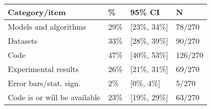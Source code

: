 \begin{tabular}{llll}
\hline
Category/item & \% & 95\% CI  & N \\
\hline
Models and algorithms & 29\% & [23\%, 34\%] & 78/270\\
Datasets & 33\% & [28\%, 39\%] & 90/270\\
Code & 47\% & [40\%, 53\%] & 126/270\\
Experimental results & 26\% & [21\%, 31\%] & 69/270\\
Error bars/stat. sign.& 2\% & [0\%, 4\%] & 5/270\\
Code is or will be available & 23\% & [19\%, 29\%] & 63/270\\
\hline
\end{tabular}
